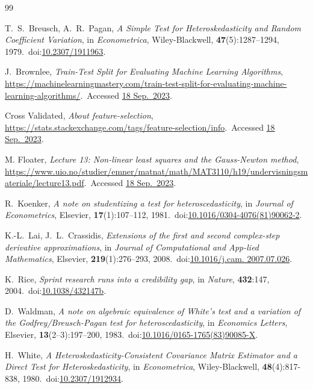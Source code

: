 \documentclass[12pt,a4paper,titlepage,oneside]{article}
\numberwithin{equation}{section}
\numberwithin{figure}{section}
\numberwithin{table}{section}
\theoremstyle{definition}
\theoremstyle{remark}
\begin{document}
\begin{thebibliography}{99}

	T.\ S.\ Breusch, A.\ R.\ Pagan, \emph{A Simple Test for Heteroskedasticity and Random Coefficient Variation}, in \emph{Econometrica}, Wiley-Blackwell, \textbf{47}(5):1287–1294, 1979.\ doi:\href{https://doi.org/10.2307/1911963}{10.2307/1911963}.

	J.\ Brownlee, \emph{Train-Test Split for Evaluating Machine Learning Algorithms}, \url{https://machinelearningmastery.com/train-test-split-for-evaluating-machine-learning-algorithms/}.\ Accessed \href{https://web.archive.org/web/20230608114141/https://machinelearningmastery.com/train-test-split-for-evaluating-machine-learning-algorithms/}{18 Sep.\ 2023}.

	Cross Validated, \emph{About feature-selection}, \url{https://stats.stackexchange.com/tags/feature-selection/info}.\ Accessed \href{https://web.archive.org/web/20220521232028/https://stats.stackexchange.com/tags/feature-selection/info}{18 Sep.\ 2023}.

	M. Floater, \emph{Lecture 13: Non-linear least squares and the Gauss-Newton method}, \url{https://www.uio.no/studier/emner/matnat/math/MAT3110/h19/undervisningsmateriale/lecture13.pdf}.\ Accessed \href{https://web.archive.org/web/20230129044854/https://www.uio.no/studier/emner/matnat/math/MAT3110/h19/undervisningsmateriale/lecture13.pdf}{18 Sep.\ 2023}.

	R.\ Koenker, \emph{A note on studentizing a test for heteroscedasticity}, in \emph{Journal of Econometrics}, Elsevier, \textbf{17}(1):107–112, 1981.\ doi:\href{https://doi.org/10.1016/0304-4076(81)90062-2}{10.1016/0304-4076(81)90062-2}.

	K.-L.\ Lai, J.\ L.\ Crassidis, \emph{Extensions of the first and second complex-step derivative approximations}, in \emph{Journal of Computational and App-lied Mathematics}, Elsevier, \textbf{219}(1):276–293, 2008.\ doi:\href{https://doi.org/10.1016/j.cam.2007.07.026}{10.1016/j.cam. 2007.07.026}.

	K.\ Rice, \emph{Sprint research runs into a credibility gap}, in \emph{Nature}, \textbf{432}:147, 2004.\ doi:\href{https://doi.org/10.1038/432147b}{10.1038/432147b}.

	D.\ Waldman, \emph{A note on algebraic equivalence of White's test and a variation of the Godfrey/Breusch-Pagan test for heteroscedasticity}, in \emph{Economics Letters}, Elsevier, \textbf{13}(2–3):197–200, 1983.\ doi:\href{https://doi.org/10.1016/0165-1765(83)90085-X}{10.1016/0165-1765(83)90085-X}.

	H.\ White, \emph{A Heteroskedasticity-Consistent Covariance Matrix Estimator and a Direct Test for Heteroskedasticity}, in \emph{Econometrica}, Wiley-Blackwell, \textbf{48}(4):817-838, 1980.\ doi:\href{https://doi.org/10.2307/1912934}{10.2307/1912934}.

\end{thebibliography}
\end{document}
